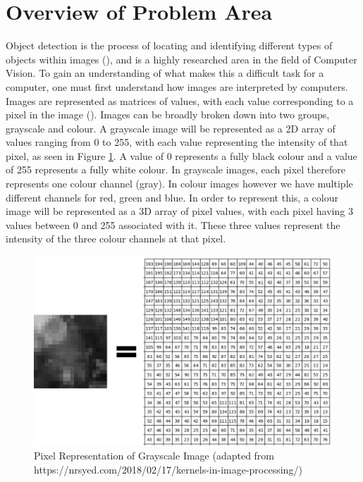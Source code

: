 \documentclass[12pt]{report}
\begin{document}
\section{Overview of Problem Area}
\begin{flushleft}
Object detection is the process of locating and identifying different types of objects within images (\cite{verschae2015object}), and is a highly researched area in the field of Computer Vision. To gain an understanding of what makes this a difficult task for a computer, one must first understand how images are interpreted by computers. Images are represented as matrices of values, with each value corresponding to a pixel in the image (\cite{learned2011introduction}). Images can be broadly broken down into two groups, grayscale and colour. A grayscale image will be represented as a 2D array of values ranging from 0 to 255, with each value representing the intensity of that pixel, as seen in Figure \ref{fig:pixels}. A value of 0 represents a fully black colour and a value of 255 represents a fully white colour. In grayscale images, each pixel therefore represents one colour channel (gray). In colour images however we have multiple different channels for red, green and blue. In order to represent this, a colour image will be represented as a 3D array of pixel values, with each pixel having 3 values between 0 and 255 associated with it. These three values represent the intensity of the three colour channels at that pixel.
\end{flushleft}

\vspace{0.5cm}
\begin{figure}[ht!]
	\centering
	\includegraphics[width=12cm]{pixels}
	\caption{Pixel Representation of Grayscale Image (adapted from https://nrsyed.com/2018/02/17/kernels-in-image-processing/)}
	\label{fig:pixels}
\end{figure}
\end{document}
